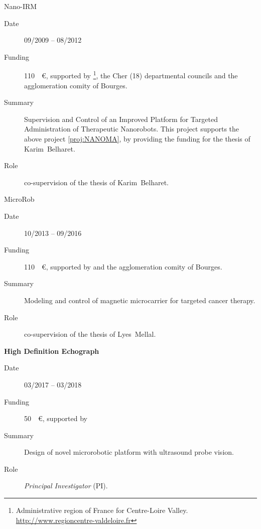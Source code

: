 \begin{CVlist}[label={[LP\arabic*]}]
  \item{}\textsf{Nano-IRM}
  \begin{description}
    \item[Date] 09/2009 -- 08/2012
    \item[Funding] \SI{110}{\kilo\euro}, supported by \footnote{Administrative region of France for Centre-Loire Valley. \url{http://www.regioncentre-valdeloire.fr}}, the Cher (18) departmental councils and the agglomeration comity of Bourges.
    \item[Summary] Supervision and Control of an Improved \MRI Platform for Targeted Administration of Therapeutic Nanorobots.
    This project supports the above  project \ref{proj:NANOMA}, by providing the funding for the \PhD thesis of Karim~Belharet.
    \item[Role] co-supervision of the \PhD thesis of Karim~Belharet.
  \end{description}

  \medskip
  \item{}\textsf{MicroRob}
  \begin{description}
  \item[Date] 10/2013 -- 09/2016
  \item[Funding] \SI{110}{\kilo\euro}, supported by  and the agglomeration comity of Bourges.
  \item[Summary] Modeling and control of magnetic microcarrier for targeted cancer therapy.
  \item[Role] co-supervision of the \PhD thesis of Lyes~Mellal.
  \end{description}
  \medskip
  
  \item{}\textsf{\bfseries High Definition Echograph}
  \begin{description}
    \item[Date] 03/2017 -- 03/2018
    \item[Funding] \SI{50}{\kilo\euro}, supported by  
    \item[Summary] Design of novel microrobotic platform with ultrasound probe vision.
    \item[Role] \textsl{Principal Investigator} (PI).
  \end{description}

\end{CVlist}


